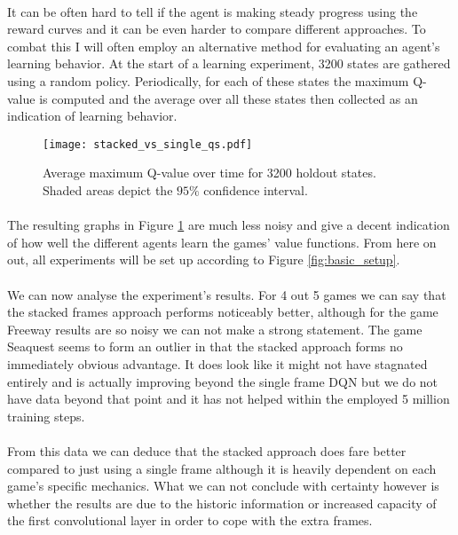 \paragraph{}
It can be often hard to tell if the agent is making steady progress
using the reward curves
and it can be even harder to compare different approaches.
To combat this I will often employ an alternative method
for evaluating an agent's learning behavior.
At the start of a learning experiment, 3200 states are gathered
using a random policy.
Periodically,
for each of these states the maximum Q-value is computed
and the average over all these states then collected
as an indication of learning behavior.

\begin{figure}[htpb]
  \centering
  \texttt{[image: stacked\_vs\_single\_qs.pdf]}
  \caption[DQN Q-values over time]{
    Average maximum Q-value over time for 3200 holdout states.
    Shaded areas depict the $95\%$ confidence interval.
  }
  \label{fig:stacked_vs_single_qs}
\end{figure}

\paragraph{}
The resulting graphs in Figure \ref{fig:stacked_vs_single_qs}
are much less noisy
and give a decent indication of how well the
different agents learn the games' value functions.
From here on out,
all experiments will be set up according to
Figure \ref{fig:basic_setup}.

\paragraph{}
We can now analyse the experiment's results.
For 4 out 5 games we can say that the stacked frames approach
performs noticeably better,
although for the game Freeway results are so noisy
we can not make a strong statement.
The game Seaquest seems to form an outlier
in that the stacked approach forms no immediately obvious advantage.
It does look like it might not have stagnated entirely
and is actually improving beyond the single frame DQN
but we do not have data beyond that point
and it has not helped within the employed 5 million training steps.

\paragraph{}
From this data we can deduce that the stacked approach does
fare better compared to just using a single frame
although it is heavily dependent on each game's specific mechanics.
What we can not conclude with certainty however
is whether the results are due to the historic information
or increased capacity of the first convolutional layer
in order to cope with the extra frames.


